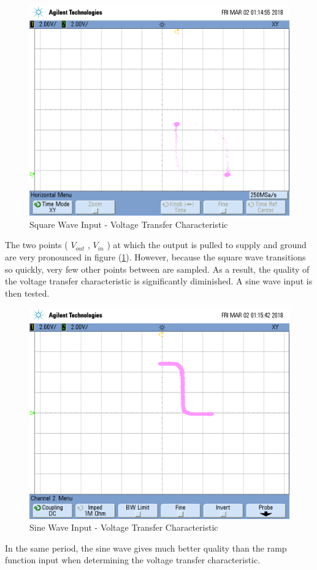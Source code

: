 \FloatBarrier

\begin{figure}[h!]
	\centering
	\includegraphics[scale=0.30]{./images/square_wave_vtc.png}
	\caption{Square Wave Input - Voltage Transfer Characteristic}
	\label{fig:square_wave_vtc}
\end{figure}

\FloatBarrier

The two points ( $V_{out}$ , $V_{in}$ ) at which the output is pulled to supply and ground are very pronounced in figure (\ref{fig:square_wave_vtc}).
However, because the square wave transitions so quickly, very few other points between are sampled.
As a result, the quality of the voltage transfer characteristic is significantly diminished.
A sine wave input is then tested.

\FloatBarrier

\begin{figure}[h!]
	\centering
	\includegraphics[scale=0.30]{./images/sine_wave_input_vtc.png}
	\caption{Sine Wave Input - Voltage Transfer Characteristic}
	\label{fig:sine_wave_input_vtc}
\end{figure}

\FloatBarrier

In the same period, the sine wave gives much better quality than the ramp function input when determining the voltage transfer characteristic.
